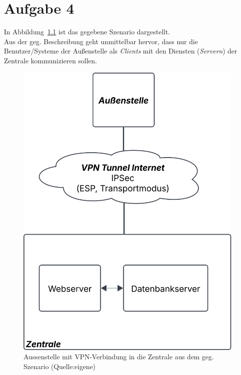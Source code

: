 \chapter{Aufgabe 4}


\noindent
In Abbildung~\ref{fig:aussenstelle} ist das gegebene Szenario dargestellt.\\
Aus der geg. Beschreibung geht unmittelbar hervor, dass nur die Benutzer/Systeme der Außenstelle als \textit{Clients} mit den Diensten (\textit{Servern}) der Zentrale kommunizieren sollen.\\

\begin{figure}
    \centering
    \includegraphics[scale=0.4]{aufgabe 4/img/aussenstelle.svg}
    \caption{Aussenstelle mit VPN-Verbindung in die Zentrale aus dem geg. Szenario (Quelle:eigene)}
    \label{fig:aussenstelle}
\end{figure}

